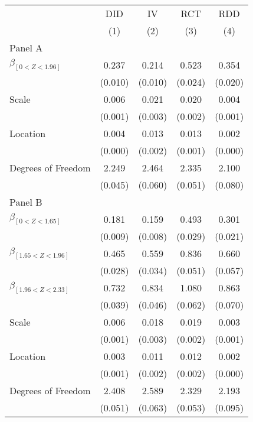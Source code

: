 \def\sym#1{\ifmmode^{#1}\else\(^{#1}\)\fi}
\begin{tabular}{l*{4}{c}}
\hline\hline
& \multicolumn{1}{c}{DID} &  \multicolumn{1}{c}{IV} &  \multicolumn{1}{c}{RCT} &  \multicolumn{1}{c}{RDD}\\

& \multicolumn{1}{c}{(1)} &  \multicolumn{1}{c}{(2)} &  \multicolumn{1}{c}{(3)} &  \multicolumn{1}{c}{(4)}\\

\hline
\hline

Panel A \\

$\beta_{[0 < Z < 1.96]}$ & 0.237 &  0.214 &  0.523 &  0.354\\
& (0.010) &  (0.010) &  (0.024) &  (0.020)\\

Scale & 0.006 &  0.021 &  0.020 &  0.004\\
& (0.001) &  (0.003) &  (0.002) &  (0.001)
\\

Location & 0.004 &  0.013 &  0.013 &  0.002\\
& (0.000) &  (0.002) &  (0.001) &  (0.000)
\\

Degrees of Freedom & 2.249 &  2.464 &  2.335 &  2.100\\
& (0.045) &  (0.060) &  (0.051) &  (0.080)\\
Panel B \\

$\beta_{[0 < Z < 1.65]}$ & 0.181 &  0.159 &  0.493 &  0.301\\
& (0.009) &  (0.008) &  (0.029) &  (0.021)\\

$\beta_{[1.65 < Z < 1.96]}$ & 0.465 &  0.559 &  0.836 &  0.660\\
& (0.028) &  (0.034) &  (0.051) &  (0.057)\\


$\beta_{[1.96 < Z < 2.33]}$ & 0.732 &  0.834 &  1.080 &  0.863\\
& (0.039) &  (0.046) &  (0.062) &  (0.070)\\

Scale & 0.006 &  0.018 &  0.019 &  0.003\\
& (0.001) &  (0.003) &  (0.002) &  (0.001)
\\

Location & 0.003 &  0.011 &  0.012 &  0.002\\
& (0.001) &  (0.002) &  (0.002) &  (0.000)
\\

Degrees of Freedom & 2.408 &  2.589 &  2.329 &  2.193\\
& (0.051) &  (0.063) &  (0.053) &  (0.095)\\

\hline\hline
\end{tabular}

